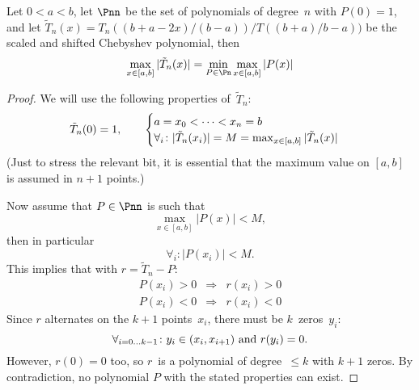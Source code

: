 \begin{theorem}
\label{th:cheby-optimal}
Let $0<a<b$, let $\Pnn$ be the set of polynomials of degree~$n$ with
$P(0)=1$, and let $\tilde T_n(x)=T_n((b+a-2x)/(b-a))/T((b+a)/b-a))$ be
the scaled and shifted Chebyshev polynomial, then
\[ \max_{x\in[a,b]} |\tilde T_n(x)|
    =\min_{P\in\Pn}\max_{x\in[a,b]}|P(x)| \]
\end{theorem}
\begin{proof}
We will use the following properties of~$\tilde T_n$:
\[ \tilde T_n(0)=1,
    \qquad \begin{cases}a=x_0<\cdots<x_n=b\cr
             \forall_i\colon |\tilde
             T_n(x_i)|=M=\max_{x\in[a,b]}|\tilde T_n(x)|\end{cases} \]
(Just to stress the relevant bit, it is essential that the maximum
             value on $[a,b]$ is assumed in $n+1$ points.)

Now assume that $P\in\Pnn$ is such that
\[ \max_{x\in[a,b]}|P(x)|<M, \]
then in particular 
\[ \forall_i\colon |P(x_i)|<M. \]
This implies that with $r=\tilde T_n-P$:
\begin{eqnarray*}
P(x_i)>0&\Rightarrow&r(x_i)>0\\
P(x_i)<0&\Rightarrow&r(x_i)<0
\end{eqnarray*}
Since $r$ alternates on the $k+1$ points~$x_i$, there must be
$k$~zeros~$y_i$:
\[ \forall_{i=0\ldots k-1}\colon \hbox{$y_i\in (x_i,x_{i+1})$ and
  $r(y_i)=0$}. \]
However, $r(0)=0$ too, so $r$~is a polynomial of degree~$\leq k$ with
$k+1$ zeros. By contradiction, no polynomial $P$ with the stated
properties can exist.
\end{proof}

